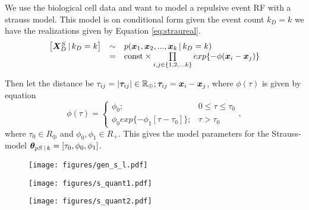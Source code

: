 \section{}
\label{sec:problem4}

We use the biological cell data and want to model a repulsive event RF with a strauss model. This model is on conditional form given the event count $k_D = k$ we have the realizations given by Equation \ref{eq:straureal}. 
\begin{equation}
    \begin{array}{rcl}
        \left[\bm{X}_D^S \, | \, k_D = k\right] & \sim & p(\bm{x}_1,\bm{x}_2,...,\bm{x}_k \, | \, k_D = k) \\
         & = & \mathrm{const} \times \prod\limits_{i,j\in \{1,2,...k\}} exp\{-\phi(\bm{x}_i-\bm{x}_j)\}
    \end{array}
    \label{eq:straureal}
\end{equation}

Then let the distance be $\tau_{ij} = |\bm{\tau}_{ij}| \in \mathbb{R}_\oplus; \bm{\tau}_{ij} = \bm{x}_i - \bm{x}_j$, where $\phi(\tau)$ is given by equation 
\begin{equation}
    \phi(\tau) = \begin{cases}
                    \phi_0; & 0 \leq \tau \leq \tau_0\\
                    \phi_0 exp\{-\phi_1[\tau-\tau_0]\}; & \tau > \tau_0
                \end{cases},
    \label{eq:interfunction}
\end{equation}
where $\tau_0 \in R_\oplus$ and $\phi_0,\phi_1 \in R_+$. This gives the model parameters for the Strauss-model $\bm{\theta} _{pS\, | \, k} = [\tau_0,\phi_0,\phi_1]$.

\begin{figure}
    \centering
    \texttt{[image: figures/gen\_s\_l.pdf]}
    \caption{}
    \label{fig:gen_ns_l}
\end{figure}

\begin{figure}
    \centering
    \texttt{[image: figures/s\_quant1.pdf]}
    \caption{}
    \label{fig:ns_quant1}
\end{figure}

\begin{figure}
    \centering
    \texttt{[image: figures/s\_quant2.pdf]}
    \caption{}
    \label{fig:ns_quant2}
\end{figure}